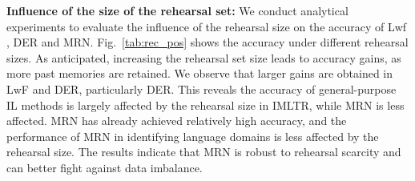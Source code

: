 \documentclass[10pt,twocolumn,letterpaper]{article}
\begin{document}
\noindent\textbf{Influence of the size of the rehearsal set:} We conduct analytical experiments to evaluate the influence of the rehearsal size on the accuracy of Lwf \cite{Li2017LWF}, DER \cite{Yan2021DER} and MRN. Fig.~\ref{tab:rec_pos} shows the accuracy under different rehearsal sizes. As anticipated, increasing the rehearsal set size leads to accuracy gains, as more past memories are retained. We observe that larger gains are obtained in LwF and DER, particularly DER. This reveals the accuracy of general-purpose IL methods is largely affected by the rehearsal size in IMLTR, while MRN is less affected. MRN has already achieved relatively high accuracy, and the performance of MRN in identifying language domains is less affected by the rehearsal size. The results indicate that MRN is robust to rehearsal scarcity and can better fight against data imbalance.
\end{document}
